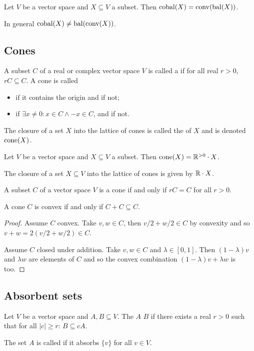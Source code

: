 \begin{lemma}
Let $V$ be a vector space and $X\subseteq V$ a subset. Then $\operatorname{cobal}(X) = \operatorname{conv}(\operatorname{bal}(X))$.
\end{lemma}
In general $\operatorname{cobal}(X) \neq \operatorname{bal}(\operatorname{conv}(X))$.



\subsection{Cones}
\begin{definition}
A subset $C$ of a real or complex vector space $V$ is called a  if for all real $r>0$, $rC \subseteq C$. A cone is called
\begin{itemize}
\item {} if it contains the origin and  if not;
\item {} if $\exists x\neq 0: x\in C \land -x\in C$, and  if not.
\end{itemize}
The closure of a set $X$ into the lattice of cones is called the  of $X$ and is denoted $\operatorname{cone}(X)$.
\end{definition}

\begin{lemma}
Let $V$ be a vector space and $X\subseteq V$ a subset. Then $\operatorname{cone}(X) = \mathbb{R}^{> 0}\cdot X$.
\end{lemma}

The closure of a set $X\subseteq V$ into the lattice of cones is given by $\mathbb{R}\cdot X$.

\begin{lemma} \label{coneEqualityLemma}
A subset $C$ of a vector space $V$ is a cone \textup{if and only if} $rC = C$ for all $r> 0$.
\end{lemma}

\begin{lemma} \label{convexityAdditiveClosure}
A cone $C$ is convex if and only if $C + C \subseteq C$. 
\end{lemma}
\begin{proof}
Assume $C$ convex. Take $v,w\in C$, then $v/2 + w/2\in C$ by convexity and so $v+w = 2(v/2+w/2)\in C$.

Assume $C$ closed under addition. Take $v,w\in C$ and $\lambda\in[0,1]$. Then $(1-\lambda)v$ and $\lambda w$ are elements of $C$ and so the convex combination $(1-\lambda)v + \lambda w$ is too.
\end{proof}


\subsection{Absorbent sets}
\begin{definition}
Let $V$ be a vector space and $A,B\subseteq V$. The $A$  $B$ if there exists a real $r>0$ such that for all $|c| \geq r$: $B\subseteq cA$.

The set $A$ is called  if it absorbs $\{v\}$ for all $v\in V$.
\end{definition}

